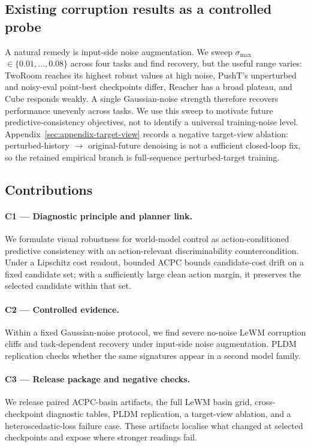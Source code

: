 \documentclass[10pt]{article}
\newcommand{\stdmax}{\ensuremath{\sigma_{\max}}}
\begin{document}
\subsection{Existing corruption results as a controlled probe}\label{sec:intro-tension}

A natural remedy is input-side noise augmentation. We sweep \stdmax{} $\in \{0.01,\dots,0.08\}$ across four tasks and find recovery, but the useful range varies: TwoRoom reaches its highest robust values at high noise, PushT's unperturbed and noisy-eval point-best checkpoints differ, Reacher has a broad plateau, and Cube responds weakly. A single Gaussian-noise strength therefore recovers performance unevenly across tasks. We use this sweep to motivate future predictive-consistency objectives, not to identify a universal training-noise level. Appendix~\ref{sec:appendix-target-view} records a negative target-view ablation: perturbed-history $\to$ original-future denoising is not a sufficient closed-loop fix, so the retained empirical branch is full-sequence perturbed-target training.

\subsection{Contributions}\label{sec:intro-contributions}

\paragraph{C1 --- Diagnostic principle and planner link.} We formulate visual robustness for world-model control as action-conditioned predictive consistency with an action-relevant discriminability countercondition. Under a Lipschitz cost readout, bounded ACPC bounds candidate-cost drift on a fixed candidate set; with a sufficiently large clean action margin, it preserves the selected candidate within that set.

\paragraph{C2 --- Controlled evidence.} Within a fixed Gaussian-noise protocol, we find severe no-noise LeWM corruption cliffs and task-dependent recovery under input-side noise augmentation. PLDM replication checks whether the same signatures appear in a second model family.

\paragraph{C3 --- Release package and negative checks.} We release paired ACPC-basin artifacts, the full LeWM basin grid, cross-checkpoint diagnostic tables, PLDM replication, a target-view ablation, and a heteroscedastic-loss failure case. These artifacts localise what changed at selected checkpoints and expose where stronger readings fail.
\end{document}
